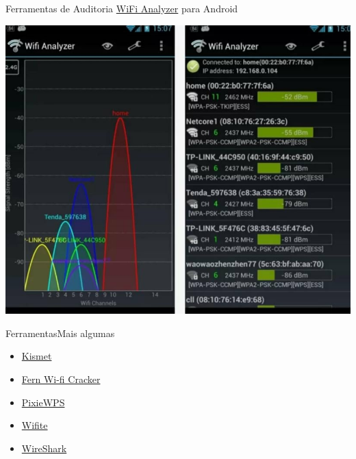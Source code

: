 \begin{frame}{Ferramentas de Auditoria}
\href{https://play.google.com/store/apps/details?id=com.farproc.wifi.analyzer&hl=pt_BR&gl=US}{WiFi Analyzer} 
para Android\bigskip

 \includegraphics[scale=.275]{wifi-analyzer.png}
\end{frame}

\begin{frame}{Ferramentas}{Mais algumas}

\begin{itemize}
\item \href{https://www.kismetwireless.net/}{Kismet}
\item \href{https://github.com/savio-code/fern-wifi-cracker}{Fern Wi-fi Cracker}
\item \href{https://github.com/wiire-a/pixiewps}{PixieWPS}
\item \href{https://github.com/derv82/wifite2}{Wifite}
\item \href{https://www.wireshark.org/}{WireShark}
\end{itemize}

\end{frame}